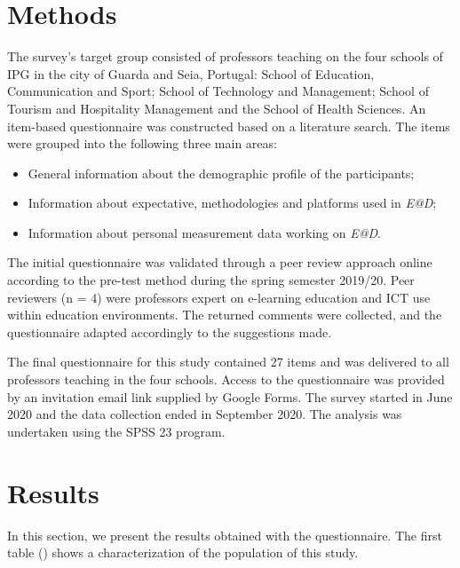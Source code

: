 \documentclass[english]{textolivre}
\begin{document}
\section{Methods}
The survey's target group consisted of professors teaching on the four schools of IPG in the city of Guarda and Seia, Portugal: School of Education, Communication and Sport; School of Technology and Management; School of Tourism and Hospitality Management and the School of Health Sciences. An item-based questionnaire was constructed based on a literature search. The items were grouped into the following three main areas:

\begin{itemize}
    \item General information about the demographic profile of the participants;
    \item Information about expectative, methodologies and platforms used in \emph{E@D};
    \item Information about personal measurement data working on \emph{E@D}.
\end{itemize}

The initial questionnaire was validated through a peer review approach online according to the pre-test method during the spring semester 2019/20. Peer reviewers (n = 4) were professors expert on e-learning education and ICT use within education environments. The returned comments were collected, and the questionnaire adapted accordingly to the suggestions made.

The final questionnaire for this study contained 27 items and was delivered to all professors teaching in the four schools. Access to the questionnaire was provided by an invitation email link supplied by Google Forms. The survey started in June 2020 and the data collection ended in September 2020. The analysis was undertaken using the SPSS 23 program. 

\section{Results}
In this section, we present the results obtained with the questionnaire. The first table () shows a characterization of the population of this study.  
\end{document}
